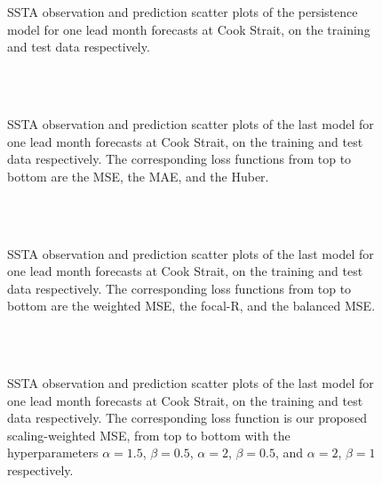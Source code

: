 \documentclass[11pt, a4paper]{article}
\begin{document}
\begin{figure}[H]
\centering
{}
\caption{SSTA observation and prediction scatter plots of the persistence model for one lead month forecasts at Cook Strait, on the training and test data respectively.}
\end{figure}

\begin{figure}[H]
\centering
{}
\\
\\
\caption{SSTA observation and prediction scatter plots of the last model for one lead month forecasts at Cook Strait, on the training and test data respectively. The corresponding loss functions from top to bottom are the MSE, the MAE, and the Huber.}
\end{figure}

\begin{figure}[H]
\centering
{}
\\
\\
\caption{SSTA observation and prediction scatter plots of the last model for one lead month forecasts at Cook Strait, on the training and test data respectively. The corresponding loss functions from top to bottom are the weighted MSE, the focal-R, and the balanced MSE.}
\end{figure}

\begin{figure}[H]
\centering
{}
\\
\\
\caption{SSTA observation and prediction scatter plots of the last model for one lead month forecasts at Cook Strait, on the training and test data respectively. The corresponding loss function is our proposed scaling-weighted MSE, from top to bottom with the hyperparameters $\alpha=1.5$, $\beta=0.5$, $\alpha=2$, $\beta=0.5$, and $\alpha=2$, $\beta=1$ respectively.}
\end{figure}
\end{document}
